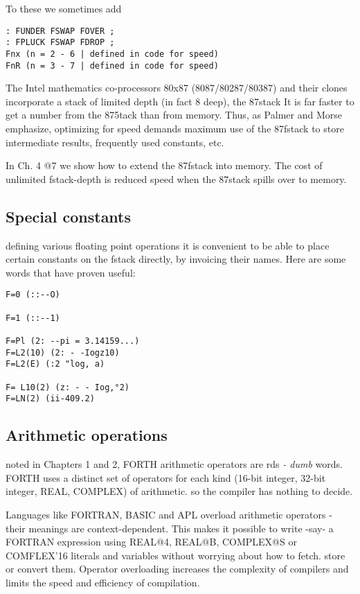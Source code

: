 To these we sometimes add

\begin{verbatim}
: FUNDER FSWAP FOVER ;
: FPLUCK FSWAP FDROP ;
Fnx (n = 2 - 6 | defined in code for speed)
FnR (n = 3 - 7 | defined in code for speed)
\end{verbatim}

The Intel mathematics co-processors 80x87 (8087/80287/80387)
and their clones incorporate a stack of limited depth (in fact 8
deep), the 87stack It is far faster to get a number from the 875tack
than from memory. Thus, as Palmer and Morse emphasize,
optimizing for speed demands maximum use of the 87fstack to store intermediate
results, frequently used constants, etc.

In Ch. 4 @7 we show how to extend the 87fstack into memory. The
cost of unlimited fstack-depth is reduced speed when the 87stack
spills over to memory.

\subsection{Special constants}
defining various floating point operations it is convenient to be
able to place certain constants on the fstack directly, by invoicing
their names. Here are some words that have proven useful:
\begin{verbatim}
F=0 (::--O)

F=1 (::--1)

F=Pl (2: --pi = 3.14159...)
F=L2(10) (2: - -Iogz10)
F=L2(E) (:2 "log, a)

F= L10(2) (z: - - Iog,°2)
F=LN(2) (ii-409.2)
\end{verbatim}
 
\subsection{Arithmetic operations}
noted in Chapters 1 and 2, FORTH arithmetic operators are
rds \textit{- dumb} words. FORTH uses a distinct set of operators
for each kind (16-bit integer, 32-bit integer, REAL, COMPLEX)
of arithmetic. so the compiler has nothing to decide.

Languages like FORTRAN, BASIC and APL overload arithmetic operators - their
meanings are context-dependent. This
makes it possible to write -say- a FORTRAN expression using
REAL@4, REAL@B, COMPLEX@S or COMFLEX'16 literals
and variables without worrying about how to fetch. store or
convert them. Operator overloading increases the complexity of
compilers and limits the speed and efficiency of compilation.

